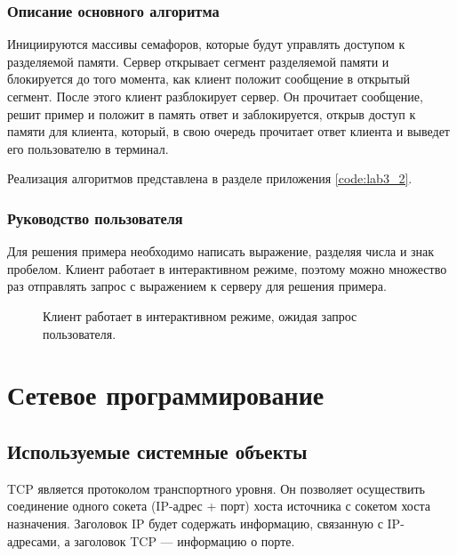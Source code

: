 \documentclass[a4paper,14pt]{extarticle}
\begin{document}
\subsubsection{Описание основного алгоритма}
Инициируются массивы семафоров, которые будут управлять доступом к разделяемой памяти. Сервер открывает сегмент разделяемой памяти и блокируется до того момента, как клиент положит сообщение в открытый сегмент. После этого клиент разблокирует сервер. Он прочитает сообщение, решит пример и положит в память ответ и заблокируется, открыв доступ к памяти для клиента, который, в свою очередь прочитает ответ клиента и выведет его пользователю в терминал. 

Реализация алгоритмов представлена в разделе приложения \ref{code:lab3_2}.

\subsubsection{Руководство пользователя}
Для решения примера необходимо написать выражение, разделяя числа и знак пробелом. Клиент работает в интерактивном режиме, поэтому можно множество раз отправлять запрос с выражением к серверу для решения примера.
\begin{figure}[h]
\caption{Клиент работает в интерактивном режиме, ожидая запрос пользователя.}
\label{1.png}
\end{figure}
\newpage

\section{Сетевое программирование}
\subsection{Используемые системные объекты}
TCP является протоколом транспортного уровня. Он позволяет осуществить соединение одного сокета (IP-адрес + порт) хоста источника с сокетом хоста назначения. Заголовок IP будет содержать информацию, связанную с IP-адресами, а заголовок TCP — информацию о порте.
\end{document}
